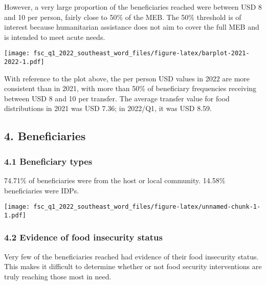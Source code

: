 \documentclass[
]{article}
\begin{document}
However, a very large proportion of the beneficiaries reached were
between USD 8 and 10 per person, fairly close to 50\% of the MEB. The
50\% threshold is of interest because humanitarian assistance does not
aim to cover the full MEB and is intended to meet acute needs.

\texttt{[image: fsc\_q1\_2022\_southeast\_word\_files/figure-latex/barplot-2021-2022-1.pdf]}

With reference to the plot above, the per person USD values in 2022 are
more consistent than in 2021, with more than 50\% of beneficiary
frequencies receiving between USD 8 and 10 per transfer. The average
transfer value for food distributions in 2021 was USD 7.36; in 2022/Q1,
it was USD 8.59.

\hypertarget{beneficiaries}{%
\subsection{4. Beneficiaries}\label{beneficiaries}}

\hypertarget{beneficiary-types}{%
\subsubsection{4.1 Beneficiary types}\label{beneficiary-types}}

74.71\% of beneficiaries were from the host or local community. 14.58\%
beneficiaries were IDPs.

\texttt{[image: fsc\_q1\_2022\_southeast\_word\_files/figure-latex/unnamed-chunk-1-1.pdf]}

\hypertarget{evidence-of-food-insecurity-status}{%
\subsubsection{4.2 Evidence of food insecurity
status}\label{evidence-of-food-insecurity-status}}

Very few of the beneficiaries reached had evidence of their food
insecurity status. This makes it difficult to determine whether or not
food security interventions are truly reaching those most in need.
\end{document}
